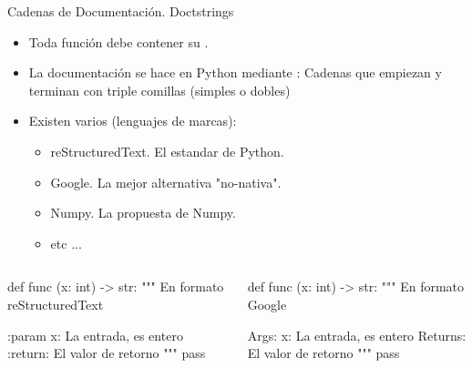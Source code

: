 \documentclass[10pt,envcountsect,spanish]{beamer}
\begin{document}
\begin{frame}[fragile]{Cadenas de Documentación. Doctstrings}

\begin{itemize}\setlength{\itemsep}{2mm}

\item Toda función debe contener su .
\item La documentación se hace en Python mediante : Cadenas que empiezan y terminan con triple comillas (simples o dobles)

\item Existen varios  (lenguajes de marcas):
\begin{itemize}
\item reStructuredText. El estandar de Python.
\item Google. La mejor alternativa "no-nativa".
\item Numpy. La propuesta de Numpy.
\item etc ...
\end{itemize}

\end{itemize}

\vskip -0.5cm

\begin{columns}[t]
\begin{column}{.5\textwidth} \tiny
\begin{pyverbatim}[][frame=single, fontsize=\footnotesize]
def func (x: int) -> str:
    """
    En formato reStructuredText
    
    :param x: La entrada, es entero
    :return: El valor de retorno
    """
    pass
\end{pyverbatim}
\end{column}

\begin{column}{.55\textwidth} \tiny
\begin{pyverbatim}[][frame=single, fontsize=\footnotesize]
def func (x: int) -> str:
    """
    En formato Google
    
    Args:
        x: La entrada, es entero
    Returns:
        El valor de retorno
    """
    pass
\end{pyverbatim}
\end{column}
\end{columns}


\end{frame}
\end{document}
